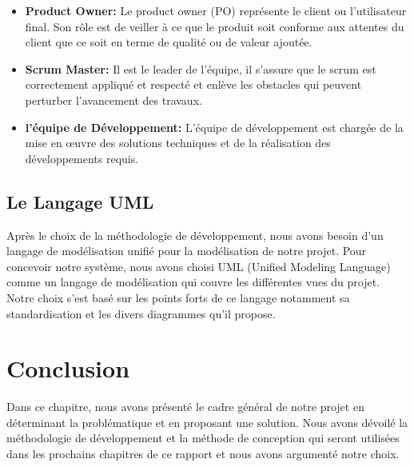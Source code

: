 \begin{itemize}
  \item \small\textbf{Product Owner: } Le product owner (PO) représente le client ou l'utilisateur final. Son rôle est de veiller à ce que le produit soit conforme aux attentes du client que ce soit en terme de qualité ou de valeur ajoutée.
  
  \item \small\textbf{Scrum Master: } Il est le leader de l'équipe, il s'assure que le scrum est correctement appliqué et respecté et enlève les obstacles qui peuvent perturber l'avancement des travaux.
  
  \item \small\textbf{l'équipe de Développement: } L'équipe de développement est chargée de la mise en œuvre des solutions techniques et de la réalisation des développements requis.
\end{itemize}

\subsection{Le Langage UML}
\noindent
Après le choix de la méthodologie de développement, nous avons besoin d’un langage de modélisation unifié pour la modélisation de notre projet. Pour concevoir notre système, nous avons choisi UML (Unified Modeling Language) comme un langage de modélisation qui couvre les différentes vues du projet. Notre choix s’est basé sur les points forts de ce langage notamment sa standardisation et les divers diagrammes qu’il propose.

\section{Conclusion}
\noindent
Dans ce chapitre, nous avons présenté le cadre général de notre projet en déterminant la problématique et en proposant une solution. Nous avons dévoilé la méthodologie de développement et la méthode de conception qui seront utilisées dans les prochains chapitres de ce rapport et nous avons argumenté notre choix.

\newpage